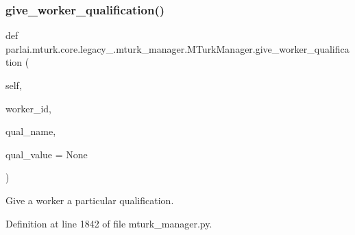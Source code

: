 \subsubsection{\texorpdfstring{give\+\_\+worker\+\_\+qualification()}{give\_worker\_qualification()}}
{\footnotesize\ttfamily def parlai.\+mturk.\+core.\+legacy\+\_.\+mturk\+\_\+manager.\+M\+Turk\+Manager.\+give\+\_\+worker\+\_\+qualification (\begin{DoxyParamCaption}\item[{}]{self,  }\item[{}]{worker\+\_\+id,  }\item[{}]{qual\+\_\+name,  }\item[{}]{qual\+\_\+value = {\ttfamily None} }\end{DoxyParamCaption})}

\begin{DoxyVerb}Give a worker a particular qualification.
\end{DoxyVerb}
 

Definition at line 1842 of file mturk\+\_\+manager.\+py.


